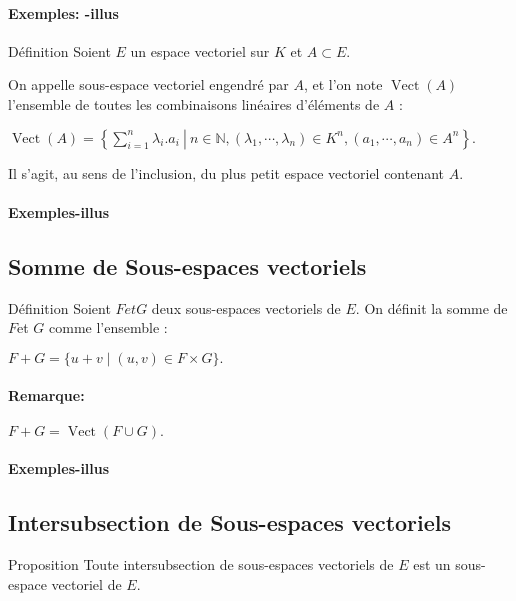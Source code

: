 \documentclass{book}
\begin{document}
\paragraph{Exemples: -illus}
\begin{Définition}[]{Définition}{}
Soient ${\displaystyle E}$ un espace vectoriel sur ${\displaystyle K}$ et ${\displaystyle A\subset E}.$

On appelle sous-espace vectoriel engendré par ${\displaystyle A} $, et l'on note ${\displaystyle \operatorname {Vect} (A)}$l’ensemble de toutes les combinaisons linéaires d'éléments de ${\displaystyle A}$ :
\begin{framed}
${\displaystyle \operatorname {Vect} (A)=\left\{\left.\sum _{i=1}^{n}\lambda _{i}.a_{i}~\right|~n\in \mathbb {N} ,(\lambda _{1},\cdots ,\lambda _{n})\in K^{n},(a_{1},\cdots ,a_{n})\in A^{n}\right\}}.$
\end{framed}
Il s'agit, au sens de l'inclusion, du plus petit espace vectoriel contenant ${\displaystyle A}.$
\end{Définition}
\paragraph{Exemples-illus}
\subsection{Somme de Sous-espaces vectoriels}
\begin{Définition}[]{Définition}{}
Soient ${\displaystyle F} et {\displaystyle G}$ deux sous-espaces vectoriels de ${\displaystyle E}.$ On définit la somme de ${\displaystyle F} $et ${\displaystyle G}$ comme l’ensemble :
\begin{framed}
${\displaystyle F+G=\{u+v\mid (u,v)\in F\times G\}}.$
\end{framed}
\end{Définition}
\paragraph{Remarque:} ${\displaystyle F+G=\operatorname {Vect} \left(F\cup G\right)}.$
\paragraph{Exemples-illus}
\subsection{Intersubsection de Sous-espaces vectoriels}
\begin{Propriété}[]{Proposition}{}
Toute intersubsection de sous-espaces vectoriels de ${\displaystyle E}$ est un sous-espace vectoriel de ${\displaystyle E}$.
\end{Propriété}
\end{document}

